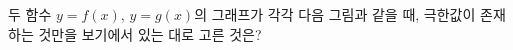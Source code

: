 두 함수 $y=f(x)$, $y=g(x)$의 그래프가 각각 다음 그림과 같을 때, 극한값이 존재하는 것만을 보기에서 있는 대로 고른 것은?
\par\smallskip\begin{center}\resizebox{\ifdim\width>\linewidth\linewidth\else\width\fi}{!}{}\end{center}
\noindent {}
